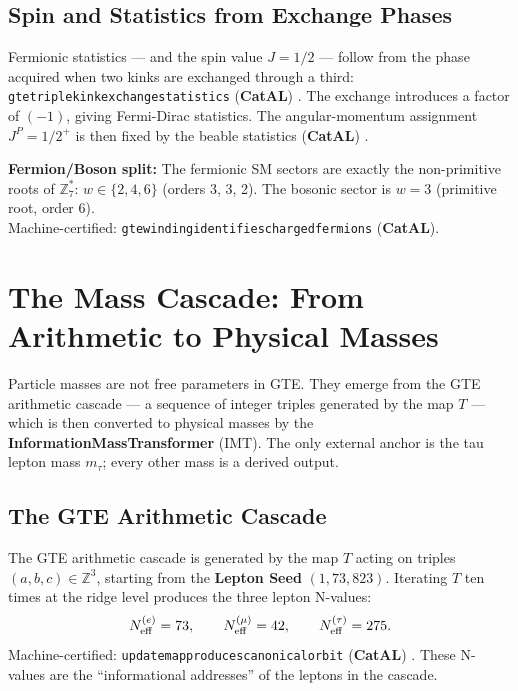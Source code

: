 \documentclass[11pt,a4paper]{article}
\newcommand{\term}[1]{\textbf{#1}}
\newcommand{\lean}[1]{%
  \penalty-100
  \begingroup\def\_{\textunderscore\allowbreak}\texttt{#1}\endgroup}
\newcommand{\CatAL}{\textbf{CatAL}}
\begin{document}
\subsection{Spin and Statistics from Exchange Phases}

Fermionic statistics — and the spin value $J = 1/2$ — follow from the phase
acquired when two kinks are exchanged through a third:
\lean{gte\_triple\_kink\_exchange\_statistics} (\CatAL)
\cite{SpivackThreeTapeCMCA}.  The exchange introduces a factor of $(-1)$, giving
Fermi-Dirac statistics.  The angular-momentum assignment $J^P = 1/2^+$ is then
fixed by the beable statistics (\CatAL) \cite{SpivackGTECompleteFramework}.

\textbf{Fermion/Boson split:} The fermionic SM sectors are exactly the
non-primitive roots of $\mathbb{Z}_7^*$: $w \in \{2,4,6\}$ (orders 3, 3, 2).
The bosonic sector is $w = 3$ (primitive root, order 6).\\
Machine-certified: \lean{gte\_winding\_identifies\_charged\_fermions} (\CatAL).

\section{The Mass Cascade: From Arithmetic to Physical Masses}
\label{sec:masses}

\begin{tcolorbox}[colback=boxorange,colframe=orange!60!black,
  title=The architecture of mass derivation]
Particle masses are not free parameters in GTE.  They emerge from the GTE
arithmetic cascade — a sequence of integer triples generated by the map $T$ —
which is then converted to physical masses by the
\term{InformationMassTransformer} (IMT).  The only external anchor is the tau
lepton mass $m_\tau$; every other mass is a derived output.
\end{tcolorbox}

\subsection{The GTE Arithmetic Cascade}

The GTE arithmetic cascade is generated by the map $T$ acting on triples
$(a,b,c) \in \mathbb{Z}^3$, starting from the \term{Lepton Seed}
$(1, 73, 823)$.  Iterating $T$ ten times at the ridge level produces the
three lepton N-values:
\begin{equation}
  N_{\rm eff}^{(e)} = 73, \qquad
  N_{\rm eff}^{(\mu)} = 42, \qquad
  N_{\rm eff}^{(\tau)} = 275.
  \label{eq:neff_leptons}
\end{equation}
Machine-certified: \lean{update\_map\_produces\_canonical\_orbit} (\CatAL)
\cite{SpivackGTECompleteFramework, Spivack2025UGP}.
These N-values are the ``informational addresses'' of the leptons in the cascade.
\end{document}
